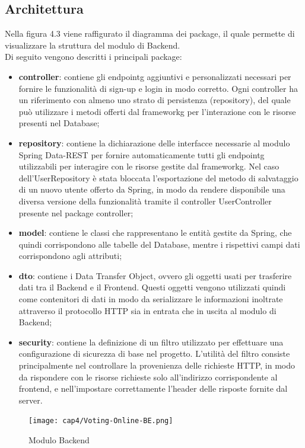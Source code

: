 \subsection{Architettura}
Nella figura 4.3 viene raffigurato il diagramma dei package, il quale permette di visualizzare la struttura del modulo di Backend. \\
Di seguito vengono descritti i principali package:
\begin{itemize}
	\item \textbf{controller}: contiene gli \gls{endpointg} aggiuntivi e personalizzati necessari per fornire le funzionalità di sign-up e login in modo corretto. Ogni controller ha un riferimento con almeno uno strato di persistenza (repository), del quale può utilizzare i metodi offerti dal \gls{frameworkg} per l'interazione con le risorse presenti nel Database;
	\item \textbf{repository}: contiene la dichiarazione delle interfacce necessarie al modulo Spring Data-REST per fornire automaticamente tutti gli \gls{endpointg} utilizzabili per interagire con le risorse gestite dal \gls{frameworkg}. Nel caso dell'UserRepository è stata bloccata l'esportazione del metodo di salvataggio di un nuovo utente offerto da Spring, in modo da rendere disponibile una diversa versione della funzionalità tramite il controller UserController presente nel package controller;
	\item \textbf{model}: contiene le classi che rappresentano le entità gestite da Spring, che quindi corrispondono alle tabelle del Database, mentre i rispettivi campi dati corrispondono agli attributi;
	\item \textbf{dto}: contiene i Data Transfer Object, ovvero gli oggetti usati per trasferire dati tra il Backend e il Frontend. Questi oggetti vengono utilizzati quindi come contenitori di dati in modo da serializzare le informazioni inoltrate attraverso il protocollo HTTP sia in entrata che in uscita al modulo di Backend;
	\item \textbf{security}: contiene la definizione di un filtro utilizzato per effettuare una configurazione di sicurezza di base nel progetto. L'utilità del filtro consiste principalmente nel controllare la provenienza delle richieste HTTP, in modo da rispondere con le risorse richieste solo all'indirizzo corrispondente al \gls{frontend}, e nell'impostare correttamente l'header delle risposte fornite dal server. \\	
\end{itemize}
\begin{figure}[!h] 
    \centering 
    \texttt{[image: cap4/Voting-Online-BE.png]} 
    \caption{Modulo Backend}
\end{figure}

